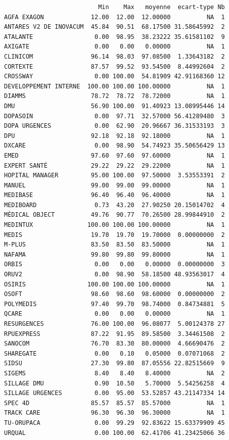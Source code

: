 \documentclass[]{article}
\begin{document}
\begin{verbatim}
                          Min    Max   moyenne  ecart-type Nb
AGFA EXAGON             12.00  12.00  12.00000          NA  1
ANTARES V2 DE INOVACUM  45.84  90.51  68.17500 31.58645992  2
ATALANTE                 0.00  98.95  38.23222 35.61581102  9
AXIGATE                  0.00   0.00   0.00000          NA  1
CLINICOM                96.14  98.03  97.08500  1.33643182  2
CORTEXTE                87.57  99.52  93.54500  8.44992604  2
CROSSWAY                 0.00 100.00  54.81909 42.91168360 12
DEVELOPPEMENT INTERNE  100.00 100.00 100.00000          NA  1
DIAMMS                  78.72  78.72  78.72000          NA  1
DMU                     56.90 100.00  91.40923 13.08995446 14
DOPASOIN                 0.00  97.71  32.57000 56.41289480  3
DOPA URGENCES            0.00  62.90  20.96667 36.31533193  3
DPU                     92.18  92.18  92.18000          NA  1
DXCARE                   0.00  98.90  54.74923 35.50656429 13
EMED                    97.60  97.60  97.60000          NA  1
EXPERT SANTÉ            29.22  29.22  29.22000          NA  1
HOPITAL MANAGER         95.00 100.00  97.50000  3.53553391  2
MANUEL                  99.00  99.00  99.00000          NA  1
MEDIBASE                96.40  96.40  96.40000          NA  1
MEDIBOARD                0.73  43.20  27.90250 20.15014702  4
MÉDICAL OBJECT          49.76  90.77  70.26500 28.99844910  2
MEDINTUX               100.00 100.00 100.00000          NA  1
MEDIS                   19.70  19.70  19.70000  0.00000000  2
M-PLUS                  83.50  83.50  83.50000          NA  1
NAFAMA                  99.80  99.80  99.80000          NA  1
ORBIS                    0.00   0.00   0.00000  0.00000000  3
ORUV2                    0.00  98.90  58.18500 48.93563017  4
OSIRIS                 100.00 100.00 100.00000          NA  1
OSOFT                   98.60  98.60  98.60000  0.00000000  2
POLYMEDIS               97.40  99.70  98.74000  0.84734881  5
QCARE                    0.00   0.00   0.00000          NA  1
RESURGENCES             76.00 100.00  96.08077  5.00124378 27
RPUEXPRESS              87.22  91.95  89.58500  3.34461508  2
SANOCOM                 76.70  83.30  80.00000  4.66690476  2
SHAREGATE                0.00   0.10   0.05000  0.07071068  2
SIDSU                   27.30  99.80  87.05556 22.82515669  9
SIGEMS                   8.40   8.40   8.40000          NA  2
SILLAGE DMU              0.90  10.50   5.70000  5.54256258  4
SILLAGE URGENCES         0.00  95.00  53.52857 43.21147334 14
SPEC 4D                 85.57  85.57  85.57000          NA  1
TRACK CARE              96.30  96.30  96.30000          NA  1
TU-ORUPACA               0.00  99.29  92.83622 15.63379909 45
URQUAL                   0.00 100.00  62.41706 41.23425066 36
\end{verbatim}
\end{document}
